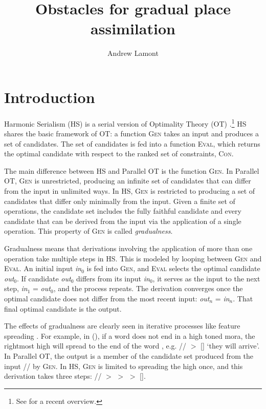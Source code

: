 \documentclass[output=paper,modfonts,nonflat,hidelinks]{langsci/langscibook}
\author{Andrew Lamont\affiliation{University of Massachusetts Amherst}}
\title{Obstacles for gradual place assimilation}
\begin{document}
\maketitle

\section{Introduction}
Harmonic Serialism (HS) is a serial version of Optimality Theory (OT) \citep{princesmolensky1993,mccarthy2000}.\footnote{See \citet{mccarthy2016} for a recent overview.} HS shares the basic framework of OT: a function \textsc{Gen} takes an input and produces a set of candidates. The set of candidates is fed into a function \textsc{Eval}, which returns the optimal candidate with respect to the ranked set of constraints, \textsc{Con}.

The main difference between HS and Parallel OT is the function \textsc{Gen}. In Parallel OT, \textsc{Gen} is unrestricted, producing an infinite set of candidates that can differ from the input in unlimited ways. In HS, \textsc{Gen} is restricted to producing a set of candidates that differ only minimally from the input. Given a finite set of operations, the candidate set includes the fully faithful candidate and every candidate that can be derived from the input via the application of a single operation. This property of \textsc{Gen} is called \textit{gradualness}.

Gradualness means that derivations involving the application of more than one operation take multiple steps in HS. This is modeled by looping between \textsc{Gen} and \textsc{Eval}. An initial input \textit{in$_0$} is fed into \textsc{Gen}, and \textsc{Eval} selects the optimal candidate \textit{out$_0$}. If candidate \textit{out$_0$} differs from its input \textit{in$_0$}, it serves as the input to the next step, \textit{in$_1$} = \textit{out$_0$}, and the process repeats. The derivation converges once the optimal candidate does not differ from the most recent input: \textit{out$_n$} = \textit{in$_n$}. That final optimal candidate is the output.

The effects of gradualness are clearly seen in iterative processes like feature spreading \citep{mccarthy2009}. For example, in  (), if a word does not end in a high toned mora, the rightmost high  will spread to the end of the word \citep{kulabickmore2015}, e.g. // $>$ [] `they will arrive'. In Parallel OT, the output \textit{} is a member of the candidate set produced from the input // by \textsc{Gen}. In HS, \textsc{Gen} is limited to spreading the high  once, and this derivation takes three steps: // $>$  $>$  $>$ []. 
\end{document}
